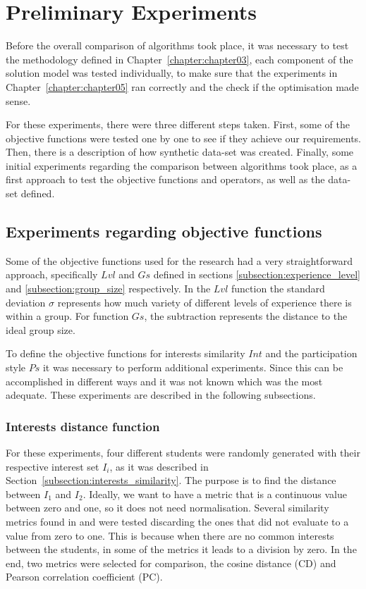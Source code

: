 \chapter{Preliminary Experiments}
\label{chapter:chapter04}

Before the overall comparison of algorithms took place, it was necessary to test the methodology defined in Chapter~\ref{chapter:chapter03}, each component of the solution model was tested individually, to make sure that the experiments in Chapter~\ref{chapter:chapter05} ran correctly and the check if the optimisation made sense.

For these experiments, there were three different steps taken. First, some of the objective functions were tested one by one to see if they achieve our requirements. Then, there is a description of how synthetic data-set was created. Finally, some initial experiments regarding the comparison between algorithms took place, as a first approach to test the objective functions and operators, as well as the data-set defined.

\section{Experiments regarding objective functions}

Some of the objective functions used for the research had a very straightforward approach, specifically $Lvl$ and $Gs$ defined in sections \ref{subsection:experience_level} and \ref{subsection:group_size} respectively. In the $Lvl$ function the standard deviation $\sigma$ represents how much variety of different levels of experience there is within a group. For function $Gs$, the subtraction represents the distance to the ideal group size.

To define the objective functions for interests similarity $Int$ and the participation style $Ps$ it was necessary to perform additional experiments. Since this can be accomplished in different ways and it was not known which was the most adequate. These experiments are described in the following subsections.

\subsection{Interests distance function}

For these experiments, four different students were randomly generated with their respective interest set $I_i$, as it was described in Section~\ref{subsection:interests_similarity}. The purpose is to find the distance between $I_1$ and $I_2$. Ideally, we want to have a metric that is a continuous value between zero and one, so it does not need normalisation. Several similarity metrics found in \cite{SeyedShirkhorshidi2015AData} and \cite{Sung-HyukChaComprehensiveFunctions} were tested discarding the ones that did not evaluate to a value from zero to one. This is because when there are no common interests between the students, in some of the metrics it leads to a division by zero. In the end, two metrics were selected for comparison, the cosine distance (CD) and Pearson correlation coefficient (PC).

